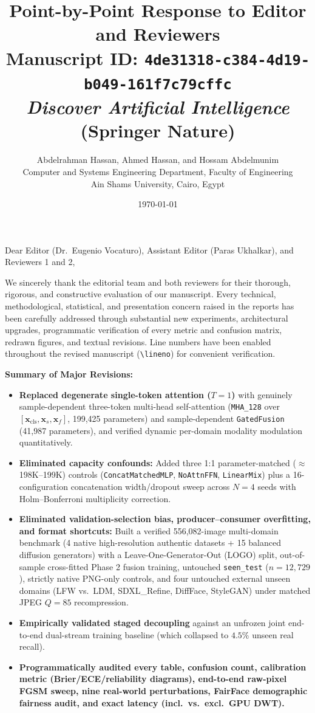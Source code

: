 \documentclass[11pt,a4paper]{article}
\title{\textbf{Point-by-Point Response to Editor and Reviewers}\\[0.4em]
\large Manuscript ID: \texttt{4de31318-c384-4d19-b049-161f7c79cffc}\\
\textit{Discover Artificial Intelligence} (Springer Nature)}
\author{Abdelrahman Hassan, Ahmed Hassan, and Hossam Abdelmunim\\
\small Computer and Systems Engineering Department, Faculty of Engineering\\
\small Ain Shams University, Cairo, Egypt}
\date{\today}
\begin{document}
\maketitle

\noindent Dear Editor (Dr.\ Eugenio Vocaturo), Assistant Editor (Paras Ukhalkar), and Reviewers 1 and 2,

\vspace{0.5em}
\noindent We sincerely thank the editorial team and both reviewers for their thorough, rigorous, and constructive evaluation of our manuscript. Every technical, methodological, statistical, and presentation concern raised in the reports has been carefully addressed through substantial new experiments, architectural upgrades, programmatic verification of every metric and confusion matrix, redrawn figures, and textual revisions. Line numbers have been enabled throughout the revised manuscript (\texttt{\textbackslash lineno}) for convenient verification.

\medskip
\noindent\textbf{Summary of Major Revisions:}
\begin{itemize}[leftmargin=1.5em,itemsep=2pt]
    \item \textbf{Replaced degenerate single-token attention ($T=1$)} with genuinely sample-dependent three-token multi-head self-attention (\texttt{MHA\_128} over $[\mathbf{x}_{\text{cls}}, \mathbf{x}_s, \mathbf{x}_f]$, 199,425 parameters) and sample-dependent \texttt{GatedFusion} (41,987 parameters), and verified dynamic per-domain modality modulation quantitatively.
    \item \textbf{Eliminated capacity confounds:} Added three 1:1 parameter-matched ($\approx$198K--199K) controls (\texttt{ConcatMatchedMLP}, \texttt{NoAttnFFN}, \texttt{LinearMix}) plus a 16-configuration concatenation width/dropout sweep across $N=4$ seeds with Holm--Bonferroni multiplicity correction.
    \item \textbf{Eliminated validation-selection bias, producer--consumer overfitting, and format shortcuts:} Built a verified 556,082-image multi-domain benchmark (4 native high-resolution authentic datasets + 15 balanced diffusion generators) with a Leave-One-Generator-Out (LOGO) split, out-of-sample cross-fitted Phase 2 fusion training, untouched \texttt{seen\_test} ($n=12,729$), strictly native PNG-only controls, and four untouched external unseen domains (LFW vs.\ LDM, SDXL\_Refine, DiffFace, StyleGAN) under matched JPEG $Q=85$ recompression.
    \item \textbf{Empirically validated staged decoupling} against an unfrozen joint end-to-end dual-stream training baseline (which collapsed to $4.5\%$ unseen real recall).
    \item \textbf{Programmatically audited every table, confusion count, calibration metric (Brier/ECE/reliability diagrams), end-to-end raw-pixel FGSM sweep, nine real-world perturbations, FairFace demographic fairness audit, and exact latency (incl.\ vs.\ excl.\ GPU DWT).}
\end{itemize}
\end{document}
